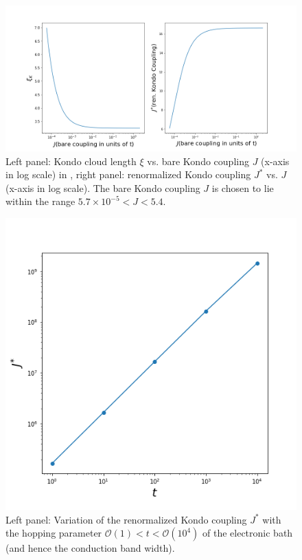 \documentclass[aps,prb,preprint,groupedaddress]{revtex4-2}
\begin{document}
\begin{figure}[ht!]
\includegraphics[scale=0.5]{KondoComplete.png}
\caption{Left panel: Kondo cloud length $\xi$ vs. bare Kondo coupling $J$ (x-axis in log scale) in , right panel: renormalized Kondo coupling $J^{*}$ vs. $J$ (x-axis in log scale). The bare Kondo coupling $J$ is chosen to lie within the range $5.7\times 10^{-5}<J<5.4$.}\label{strong}
\end{figure}
\begin{figure}[ht!]
\begin{center}
\includegraphics[scale=0.5]{KondoCouplingVst.png}
\end{center}
\caption{Left panel: Variation of the renormalized Kondo coupling $J^{*}$ with the hopping parameter $\mathcal{O}(1)<t<\mathcal{O}(10^{4})$ of the electronic bath (and hence the conduction band width).}\label{infinite}
\end{figure}
\end{document}
